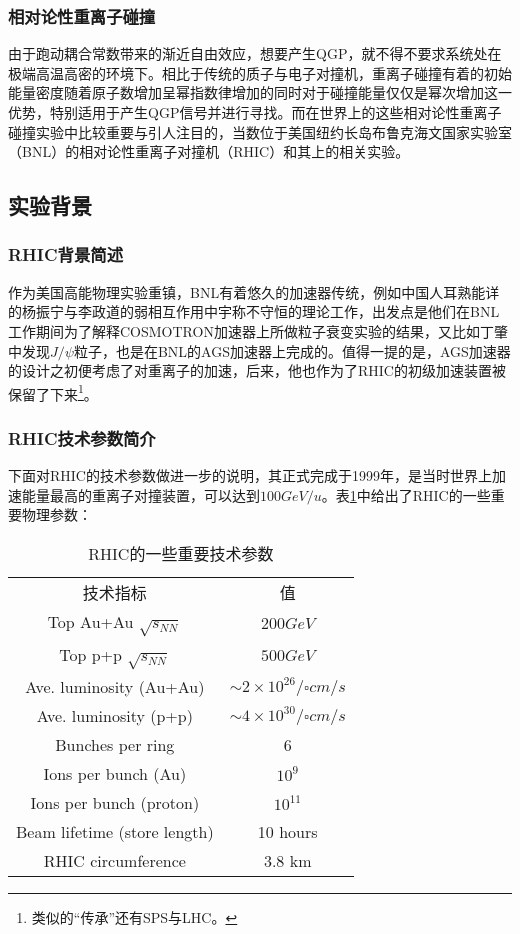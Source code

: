 \documentclass[%
 reprint,
 amsmath,amssymb,
 aps,
]{revtex4-1}
\begin{document}
\subsubsection{\label{sec:HIC}相对论性重离子碰撞}
由于跑动耦合常数带来的渐近自由效应，想要产生QGP，就不得不要求系统处在极端高温高密的环境下。相比于传统的质子与电子对撞机，重离子碰撞有着的初始能量密度随着原子数增加呈幂指数律增加的同时对于碰撞能量仅仅是幂次增加这一优势，特别适用于产生QGP信号并进行寻找。而在世界上的这些相对论性重离子碰撞实验中比较重要与引人注目的，当数位于美国纽约长岛布鲁克海文国家实验室（BNL）的相对论性重离子对撞机（RHIC）和其上的相关实验。
\subsection{\label{sec:ExpBG}实验背景}
\subsubsection{\label{sec:RHICBg}RHIC背景简述}
作为美国高能物理实验重镇，BNL有着悠久的加速器传统，例如中国人耳熟能详的杨振宁与李政道的弱相互作用中宇称不守恒的理论工作，出发点是他们在BNL工作期间为了解释COSMOTRON加速器上所做粒子衰变实验的结果，又比如丁肇中发现$J/\psi$粒子，也是在BNL的AGS加速器上完成的。值得一提的是，AGS加速器的设计之初便考虑了对重离子的加速，后来，他也作为了RHIC的初级加速装置被保留了下来\footnote{类似的“传承”还有SPS与LHC。}。

\subsubsection{\label{sec:RHICSpec}RHIC技术参数简介}
下面对RHIC的技术参数做进一步的说明，其正式完成于1999年，是当时世界上加速能量最高的重离子对撞装置，可以达到$100\si{GeV/u}$。表\ref{tab:RhicSpec}中给出了RHIC的一些重要物理参数：
\begin{table}[htbp]
    \centering
    \caption{\label{tab:RhicSpec}RHIC的一些重要技术参数}
    \begin{ruledtabular}
    \begin{tabular}{cc}
    技术指标&值  \\
    \colrule
    Top Au+Au $\sqrt{s_{NN}}$&$200 \si{GeV}$ \\
    Top p+p $\sqrt{s_{NN}}$&$500 \si{GeV}$ \\
    Ave. luminosity (Au+Au) & $\sim 2\times10^{26}\si{\per \square cm \per s}$ \\
    Ave. luminosity (p+p) & $\sim 4\times10^{30}\si{\per \square cm \per s}$ \\ 
    Bunches per ring & 6 \\
    Ions per bunch (Au) & $10^9$ \\
    Ions per bunch (proton) & $10^{11}$ \\
    Beam lifetime (store length) & 10 hours\\
    RHIC circumference & 3.8 km
    \end{tabular}
    \end{ruledtabular}
\end{table}
\end{document}

